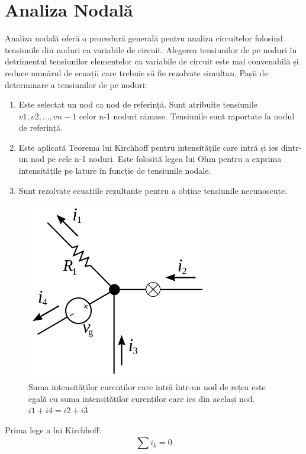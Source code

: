 \documentclass{article}
\begin{document}
\section{Analiza Nodală}
Analiza nodală oferă o procedură generală pentru analiza circuitelor folosind tensiunile din noduri ca variabile de circuit. Alegerea tensiunilor de pe noduri în detrimentul tensiunilor elementelor ca variabile de circuit este mai convenabilă și reduce numărul de ecuații care trebuie să fie rezolvate simultan.
Pașii de determinare a tensiunilor de pe noduri:
\begin{enumerate}
\item Este selectat un nod ca nod de referință. Sunt atribuite tensiunile \(v1, v2,...,vn-1\) celor n-1 noduri rămase. Tensiunile sunt raportate la nodul de referință.
\item Este aplicată Teorema lui Kirchhoff pentru intensitățile care intră și ies dintr-un nod pe cele n-1 noduri. Este folosită legea lui Ohm pentru a exprima intensitățile pe lature în funcție de tensiunile nodale.
\item Sunt rezolvate ecuațiile rezultante pentru a obține tensiunile necunoscute.
\end{enumerate}


\begin{figure}[h]
\includegraphics[width=8cm]{fig1.png}
\centering
\caption{Suma intensităților curenților care intră într-un nod de rețea este egală cu suma intensităților curenților care ies din același nod. \(i1 + i4 = i2 + i3\)}
\end{figure}

\par Prima lege a lui Kirchhoff:
\[\sum_{}^{}i_{k}=0\]
\end{document}
